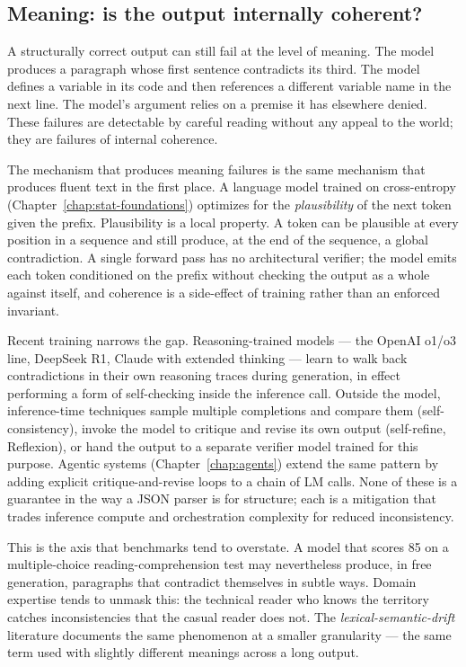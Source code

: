\subsection{Meaning: is the output internally coherent?}

A structurally correct output can still fail at the level of
meaning. The model produces a paragraph whose first sentence
contradicts its third. The model defines a variable in its code
and then references a different variable name in the next line.
The model's argument relies on a premise it has elsewhere denied.
These failures are detectable by careful reading without any
appeal to the world; they are failures of internal coherence.

The mechanism that produces meaning failures is the same mechanism
that produces fluent text in the first place. A language model
trained on cross-entropy (Chapter~\ref{chap:stat-foundations}) optimizes for the
\emph{plausibility} of the next token given the prefix.
Plausibility is a local property. A token can be plausible at
every position in a sequence and still produce, at the end of the
sequence, a global contradiction. A single forward pass has no
architectural verifier; the model emits each token conditioned on
the prefix without checking the output as a whole against itself,
and coherence is a side-effect of training rather than an enforced
invariant.

Recent training narrows the gap. Reasoning-trained models --- the
OpenAI o1/o3 line, DeepSeek R1, Claude with extended thinking ---
learn to walk back contradictions in their own reasoning traces
during generation, in effect performing a form of self-checking
inside the inference call. Outside the model, inference-time
techniques sample multiple completions and compare them
(self-consistency), invoke the model to critique and revise its
own output (self-refine, Reflexion), or hand the output to a
separate verifier model trained for this purpose. Agentic systems
(Chapter~\ref{chap:agents}) extend the same pattern by adding explicit
critique-and-revise loops to a chain of LM calls. None of these is
a guarantee in the way a JSON parser is for structure; each is a
mitigation that trades inference compute and orchestration
complexity for reduced inconsistency.

This is the axis that benchmarks tend to overstate. A model that
scores 85 on a multiple-choice reading-comprehension test may
nevertheless produce, in free generation, paragraphs that
contradict themselves in subtle ways. Domain expertise tends to
unmask this: the technical reader who knows the territory catches
inconsistencies that the casual reader does not. The
\emph{lexical-semantic-drift} literature documents the same
phenomenon at a smaller granularity --- the same term used with
slightly different meanings across a long output.

